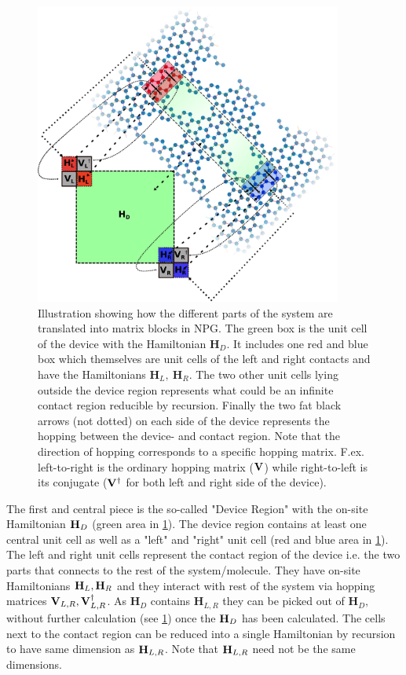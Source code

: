 \begin{figure}
	\centering
	\includegraphics[width=0.9\textwidth]{Figures/illu.eps}
	\caption{Illustration showing how the different parts of the system are translated into matrix blocks in NPG. The green box is the unit cell of the device with the Hamiltonian \(\textbf{H}_D\). It includes one red and blue box which themselves are unit cells of the left and right contacts and have the Hamiltonians \(\textbf{H}_L,\ \textbf{H}_R\). The two other unit cells lying outside the device region represents what could be an infinite contact region reducible by recursion. Finally the two fat black arrows (not dotted) on each side of the device represents the hopping between the device- and contact region. Note that the direction of hopping corresponds to a specific hopping matrix. F.ex. left-to-right is the ordinary hopping matrix (\(\vb{V}\)) while right-to-left is its conjugate (\(\vb{V}^{\dagger}\) for both left and right side of the device).}
	\label{systemillu}
\end{figure}
The first and central piece is the so-called "Device Region" with the on-site Hamiltonian \(\vb{H}_D\) (green area in \cref{systemillu}). The device region contains at least one central unit cell as well as a "left" and "right" unit cell (red and blue area in \cref{systemillu}). The left and right unit cells represent the contact region of the device i.e. the two parts that connects to the rest of the system/molecule. They have on-site Hamiltonians \(\vb{H}_L,\vb{H}_R\) and they interact with rest of the system via hopping matrices \(\vb{V}_{L,R},\vb{V}^{\dagger}_{L,R}\). As \(\textbf{H}_D\) contains \(\textbf{H}_{L,R}\) they can be picked out of \(\textbf{H}_D,\)  without further calculation (see \cref{systemillu}) once the \(\vb{H}_D\) has been calculated. The cells next to the contact region can be reduced into a single Hamiltonian by recursion to have same dimension as \(\vb{H}_{L,R}\). Note that \(\vb{H}_{L,R}\) need not be the same dimensions.
